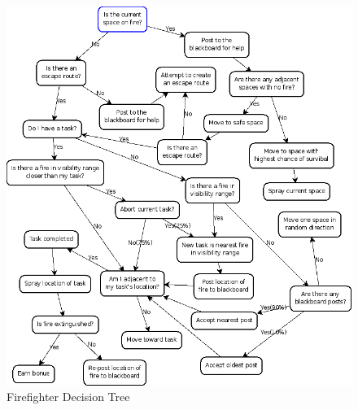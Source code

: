 \documentclass{article}
\begin{document}
\begin{figure}[htp]
  \centering
  \includegraphics[width=120mm]{images/decisiontree.png}
  \caption{Firefighter Decision Tree}\label{fig:decisiontree}
\end{figure}
\end{document}
